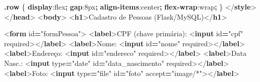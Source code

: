\documentclass[
]{book}
\newenvironment{Shaded}{\begin{snugshade}}{\end{snugshade}}
\newcommand{\CharTok}[1]{\textcolor[rgb]{0.31,0.60,0.02}{#1}}
\newcommand{\DataTypeTok}[1]{\textcolor[rgb]{0.13,0.29,0.53}{#1}}
\newcommand{\DecValTok}[1]{\textcolor[rgb]{0.00,0.00,0.81}{#1}}
\newcommand{\FunctionTok}[1]{\textcolor[rgb]{0.13,0.29,0.53}{\textbf{#1}}}
\newcommand{\KeywordTok}[1]{\textcolor[rgb]{0.13,0.29,0.53}{\textbf{#1}}}
\newcommand{\NormalTok}[1]{#1}
\newcommand{\OperatorTok}[1]{\textcolor[rgb]{0.81,0.36,0.00}{\textbf{#1}}}
\newcommand{\OtherTok}[1]{\textcolor[rgb]{0.56,0.35,0.01}{#1}}
\newcommand{\StringTok}[1]{\textcolor[rgb]{0.31,0.60,0.02}{#1}}
\begin{document}
\begin{Shaded}
\begin{Highlighting}[]
  \FunctionTok{.row}\NormalTok{ \{ }\KeywordTok{display}\CharTok{:}\DecValTok{flex}\OperatorTok{;} \KeywordTok{gap}\CharTok{:}\DecValTok{8}\DataTypeTok{px}\OperatorTok{;} \KeywordTok{align{-}items}\CharTok{:}\DecValTok{center}\OperatorTok{;} \KeywordTok{flex{-}wrap}\CharTok{:}\DecValTok{wrap}\OperatorTok{;}\NormalTok{ \}}
\DataTypeTok{\textless{}/}\KeywordTok{style}\DataTypeTok{\textgreater{}}
\DataTypeTok{\textless{}/}\KeywordTok{head}\DataTypeTok{\textgreater{}}
\DataTypeTok{\textless{}}\KeywordTok{body}\DataTypeTok{\textgreater{}}
\DataTypeTok{\textless{}}\KeywordTok{h1}\DataTypeTok{\textgreater{}}\NormalTok{Cadastro de Pessoas (Flask/MySQL)}\DataTypeTok{\textless{}/}\KeywordTok{h1}\DataTypeTok{\textgreater{}}

\DataTypeTok{\textless{}}\KeywordTok{form}\OtherTok{ id}\OperatorTok{=}\StringTok{"formPessoa"}\DataTypeTok{\textgreater{}}
  \DataTypeTok{\textless{}}\KeywordTok{label}\DataTypeTok{\textgreater{}}\NormalTok{CPF (chave primária): }\DataTypeTok{\textless{}}\KeywordTok{input}\OtherTok{ id}\OperatorTok{=}\StringTok{"cpf"}\OtherTok{ required}\DataTypeTok{\textgreater{}\textless{}/}\KeywordTok{label}\DataTypeTok{\textgreater{}}
  \DataTypeTok{\textless{}}\KeywordTok{label}\DataTypeTok{\textgreater{}}\NormalTok{Nome: }\DataTypeTok{\textless{}}\KeywordTok{input}\OtherTok{ id}\OperatorTok{=}\StringTok{"nome"}\OtherTok{ required}\DataTypeTok{\textgreater{}\textless{}/}\KeywordTok{label}\DataTypeTok{\textgreater{}}
  \DataTypeTok{\textless{}}\KeywordTok{label}\DataTypeTok{\textgreater{}}\NormalTok{Endereço: }\DataTypeTok{\textless{}}\KeywordTok{input}\OtherTok{ id}\OperatorTok{=}\StringTok{"endereco"}\OtherTok{ required}\DataTypeTok{\textgreater{}\textless{}/}\KeywordTok{label}\DataTypeTok{\textgreater{}}
  \DataTypeTok{\textless{}}\KeywordTok{label}\DataTypeTok{\textgreater{}}\NormalTok{Data Nasc.: }\DataTypeTok{\textless{}}\KeywordTok{input}\OtherTok{ type}\OperatorTok{=}\StringTok{"date"}\OtherTok{ id}\OperatorTok{=}\StringTok{"data\_nascimento"}\OtherTok{ required}\DataTypeTok{\textgreater{}\textless{}/}\KeywordTok{label}\DataTypeTok{\textgreater{}}
  \DataTypeTok{\textless{}}\KeywordTok{label}\DataTypeTok{\textgreater{}}\NormalTok{Foto: }\DataTypeTok{\textless{}}\KeywordTok{input}\OtherTok{ type}\OperatorTok{=}\StringTok{"file"}\OtherTok{ id}\OperatorTok{=}\StringTok{"foto"}\OtherTok{ accept}\OperatorTok{=}\StringTok{"image/*"}\DataTypeTok{\textgreater{}\textless{}/}\KeywordTok{label}\DataTypeTok{\textgreater{}}


\end{Highlighting}
\end{Shaded}
\end{document}
